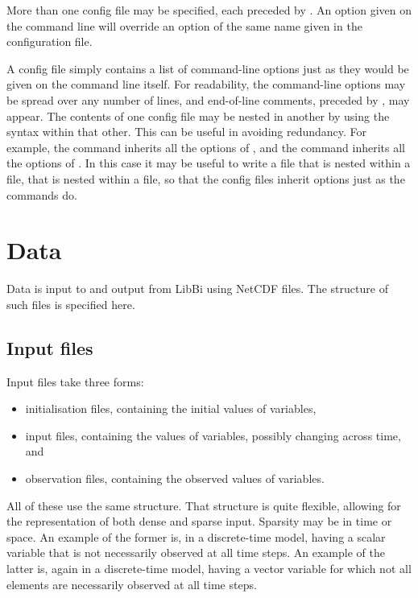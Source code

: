 More than one config file may be specified, each preceded by . An
option given on the command line will override an option of the same name
given in the configuration file.

A config file simply contains a list of command-line options just as they
would be given on the command line itself. For readability, the command-line
options may be spread over any number of lines, and end-of-line comments,
preceded by \bitt{\#}, may appear. The contents of one config file may be
nested in another by using the  syntax within that
other. This can be useful in avoiding redundancy. For example, the
 command inherits all the options of ,
and the  command inherits all the options of
. In this case it may be useful to write a
 file that is nested within a  file,
that is nested within a  file, so that the config files
inherit options just as the commands do.


\section{Data\label{Data}}

Data is input to and output from LibBi using NetCDF files. The
structure of such files is specified here.

\subsection{Input files}

Input files take three forms:
\begin{itemize}
\item initialisation files, containing the initial values of 
  variables,
\item input files, containing the values of  variables, possibly
  changing across time, and
\item observation files, containing the observed values of 
  variables.
\end{itemize}
All of these use the same structure. That structure is quite flexible,
allowing for the representation of both dense and sparse input. Sparsity may
be in time or space. An example of the former is, in a discrete-time model,
having a scalar  variable that is not necessarily observed at all
time steps. An example of the latter is, again in a discrete-time model,
having a vector  variable for which not all elements are necessarily
observed at all time steps.

